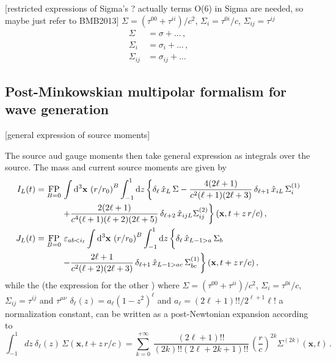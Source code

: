 \documentclass[
superscriptaddress,
preprint,
prd,tightenlines,showpacs,nofootinbib,
eqsecnum,
amsfonts,amsmath,amssymb]{revtex4-1}
\newcommand{\ud}{\mathrm{d}}
\newcommand{\vph}[1]{\vphantom{#1}}
\newcommand{\be}{\begin{equation}}
\newcommand{\ee}{\end{equation}}
\newcommand{\nn}{\nonumber}
\begin{document}
[restricted expressions of Sigma's ? actually terms O(6) in Sigma are needed, so maybe just refer to BMB2013]
$\Sigma = (\tau^{00}+\tau^{ii})/c^{2}$, $\Sigma_{i} = \tau^{0i}/c$, $\Sigma_{ij} = \tau^{ij}$
\begin{subequations}\label{eq:defSigma}
\begin{align}
  \Sigma & = \sigma + \dots\,, \\ 
  \Sigma_{i} &= \sigma_{i} + \dots \,, \\
  \Sigma_{ij} &= \sigma_{ij} + \dots
\end{align}
\end{subequations}


\subsection{Post-Minkowskian multipolar formalism for wave generation}
\label{subsec:summarymultipolar}

[general expression of source moments]

The source aud gauge moments then take general expression as integrals over the source. The mass and current source moments are given by~\cite{}
\begin{subequations}\label{eq:defILJL}
\begin{align}
	I_L(t) &= \mathop{\mathrm{FP}}_{B=0}\,\int \ud^3\mathbf{x}\,\left(r/r_0\right)^B \int^1_{-1} \ud z\left\{\delta_\ell\,\hat{x}_L\,\Sigma -\frac{4(2\ell+1)}{c^2(\ell+1)(2\ell+3)} \,\delta_{\ell+1} \,\hat{x}_{iL} \,\Sigma_i^{(1)}\right.\nn\\
	&\qquad\quad \left. +\frac{2(2\ell+1)}{c^4(\ell+1)(\ell+2)(2\ell+5)} \,\delta_{\ell+2}\,\hat{x}_{ijL}\Sigma_{ij}^{(2)}\right\}(\mathbf{x},t+z\,r/c)\,,\\
	J_L(t) &= \mathop{\mathrm{FP}}_{B=0}\,\varepsilon_{ab<i_\ell} \int \ud^3 \mathbf{x}\,\left(r/r_0\right)^B \int^1_{-1} \ud z\left\{\vph{\frac{1}{1}} \delta_\ell\,\hat{x}_{L-1>a} \,\Sigma_b \right. \nn\\
	&\qquad\quad \left. -\frac{2\ell+1}{c^2(\ell+2)(2\ell+3)} \,\delta_{\ell+1}\,\hat{x}_{L-1>ac} \,\Sigma_{bc}^{(1)}\right\} (\mathbf{x},t+z\,r/c)\,,
\end{align}\end{subequations}
while the (the expression for the other )
%
where $\Sigma = (\tau^{00}+\tau^{ii})/c^{2}$, $\Sigma_{i} = \tau^{0i}/c$, $\Sigma_{ij} = \tau^{ij}$ and $\tau^{\mu\nu}$  $\delta_{\ell}(z) = a_{\ell}(1-z^{2})^{\ell}$ and $a_{\ell} = (2\ell+1)!!/2^{\ell+1}\ell!$ a normalization constant, can be written as a post-Newtonian expansion according to
%
\be\label{eq:intdeltal}
	\int^1_{-1} dz~ \delta_\ell(z) \,\Sigma(\mathbf{x},t+z\,r/c) = \sum_{k=0}^{+\infty}\,\frac{(2\ell+1)!!}{(2k)!!(2\ell+2k+1)!!}\,\left(\frac{r}{c}\right)^{2k}\!\Sigma^{(2k)}(\mathbf{x},t)\,.
\ee
\end{document}
